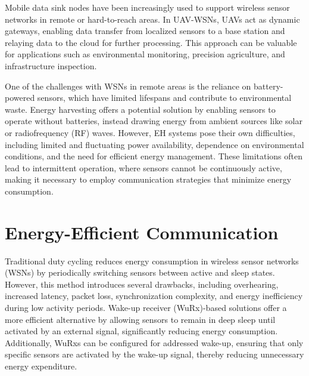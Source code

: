 \documentclass[conference]{IEEEtran}
\begin{document}
Mobile data sink nodes have been increasingly used to support wireless sensor networks in remote or hard-to-reach areas\cite{gradys,uav_wsn_survey,survey_monitoring_uavwsn}. In UAV-WSNs, UAVs act as dynamic gateways, enabling data transfer from localized sensors to a base station and relaying data to the cloud for further processing. This approach can be valuable for applications such as environmental monitoring\cite{flood_forecasting_uavwsn,rural_environmental_monitoring_uavwsn}, precision agriculture\cite{agriculture_uavwsn}, and infrastructure inspection\cite{structure_monitoring_uavwsn}.

One of the challenges with WSNs in remote areas is the reliance on battery-powered sensors, which have limited lifespans and contribute to environmental waste. Energy harvesting offers a potential solution by enabling sensors to operate without batteries, instead drawing energy from ambient sources like solar or radiofrequency (RF) waves\cite{battery_vs_eh, eh_in_wsns_review}. However, EH systems pose their own difficulties, including limited and fluctuating power availability, dependence on environmental conditions, and the need for efficient energy management. These limitations often lead to intermittent operation, where sensors cannot be continuously active, making it necessary to employ communication strategies that minimize energy consumption\cite{eh_limits}.

\section{Energy-Efficient Communication}

Traditional duty cycling reduces energy consumption in wireless sensor networks (WSNs) by periodically switching sensors between active and sleep states\cite{duty_cycle_results}. However, this method introduces several drawbacks, including overhearing, increased latency, packet loss, synchronization complexity, and energy inefficiency during low activity periods. Wake-up receiver (WuRx)-based solutions offer a more efficient alternative by allowing sensors to remain in deep sleep until activated by an external signal, significantly reducing energy consumption\cite{duty_cycling_vs_receiver,eh_wake_receiver_benefits}. Additionally, WuRxs can be configured for addressed wake-up, ensuring that only specific sensors are activated by the wake-up signal, thereby reducing unnecessary energy expenditure\cite{overview_wurx_survey,receiver_with_addressing}.
\end{document}
